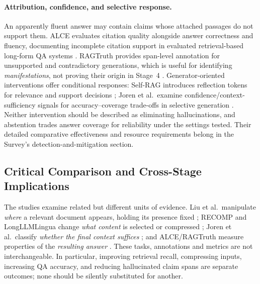 \paragraph{Attribution, confidence, and selective response.}
An apparently fluent answer may contain claims whose attached passages do not support them. ALCE evaluates citation quality alongside answer correctness and fluency, documenting incomplete citation support in evaluated retrieval-based long-form QA systems \cite[Secs.~2--4]{gao2023alce}. RAGTruth provides span-level annotation for unsupported and contradictory generations, which is useful for identifying \emph{manifestations}, not proving their origin in Stage~4 \cite[Secs.~2--3]{niu2024ragtruth}. Generator-oriented interventions offer conditional responses: Self-RAG introduces reflection tokens for relevance and support decisions \cite[Sec.~3]{asai2024selfrag}; Joren et al.\ examine confidence/context-sufficiency signals for accuracy--coverage trade-offs in selective generation \cite[Sec.~5]{joren2025sufficient}. Neither intervention should be described as eliminating hallucinations, and abstention trades answer coverage for reliability under the settings tested. Their detailed comparative effectiveness and resource requirements belong in the Survey's detection-and-mitigation section.

\subsection{Critical Comparison and Cross-Stage Implications}
\label{subsec:section6-comparison}

The studies examine related but different units of evidence. Liu et al.\ manipulate \emph{where} a relevant document appears, holding its presence fixed \cite{liu2024lost}; RECOMP and LongLLMLingua change \emph{what content} is selected or compressed \cite{xu2024recomp,jiang2024longllmlingua}; Joren et al.\ classify \emph{whether the final context suffices} \cite{joren2025sufficient}; and ALCE/RAGTruth measure properties of the \emph{resulting answer} \cite{gao2023alce,niu2024ragtruth}. These tasks, annotations and metrics are not interchangeable. In particular, improving retrieval recall, compressing inputs, increasing QA accuracy, and reducing hallucinated claim spans are separate outcomes; none should be silently substituted for another.

